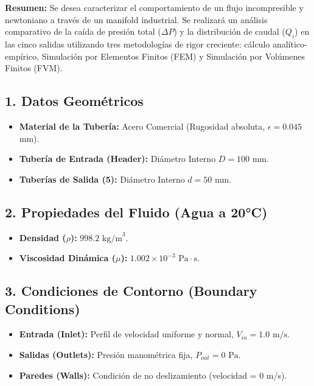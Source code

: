 \documentclass[11pt, a4paper,oneside]{article}
\begin{document}
\begin{problembox}
\textbf{Resumen:} Se desea caracterizar el comportamiento de un flujo incompresible y newtoniano a través de un manifold industrial. Se realizará un análisis comparativo de la caída de presión total ($\Delta P$) y la distribución de caudal ($Q_i$) en las cinco salidas utilizando tres metodologías de rigor creciente: cálculo analítico-empírico, Simulación por Elementos Finitos (FEM) y Simulación por Volúmenes Finitos (FVM).

\subsection*{1. Datos Geométricos}
\begin{itemize}
    \item \textbf{Material de la Tubería:} Acero Comercial (Rugosidad absoluta, $\epsilon = 0.045$ mm).
    \item \textbf{Tubería de Entrada (Header):} Diámetro Interno $D = 100 \text{ mm}$.
    \item \textbf{Tuberías de Salida (5):} Diámetro Interno $d = 50 \text{ mm}$.
\end{itemize}

\subsection*{2. Propiedades del Fluido (Agua a 20°C)}
\begin{itemize}
    \item \textbf{Densidad ($\rho$):} $998.2 \text{ kg/m}^3$.
    \item \textbf{Viscosidad Dinámica ($\mu$):} $1.002 \times 10^{-3} \text{ Pa}\cdot\text{s}$.
\end{itemize}

\subsection*{3. Condiciones de Contorno (Boundary Conditions)}
\begin{itemize}
    \item \textbf{Entrada (Inlet):} Perfil de velocidad uniforme y normal, $V_{in} = 1.0 \text{ m/s}$.
    \item \textbf{Salidas (Outlets):} Presión manométrica fija, $P_{out} = 0 \text{ Pa}$.
    \item \textbf{Paredes (Walls):} Condición de no deslizamiento (velocidad = 0 m/s).
\end{itemize}
\end{problembox}
\end{document}
